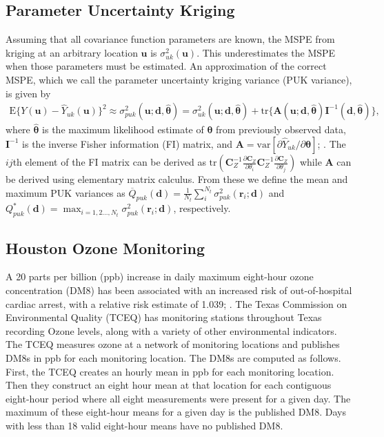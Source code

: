 \documentclass[cmbright]{staauth}
\newcommand{\var}{\mathrm{var}}
\newcommand{\E}{\mathrm{E}}
\newcommand{\tr}{\mathrm{tr}}
\begin{document}
\subsection{Parameter Uncertainty Kriging}
Assuming that all covariance function parameters are known, the MSPE from kriging at an arbitrary location $\bm{u}$ is $\sigma_{uk}^2(\bm{u})$. This underestimates the MSPE when those parameters must be estimated. An approximation of the correct MSPE, which we call the parameter uncertainty kriging variance (PUK variance), is given by
\begin{align*}
\E\{Y(\bm{u}) - \widehat{Y}_{uk}(\bm{u})\}^2 \approx \sigma^2_{puk}(\bm{u};\bm{d},\widehat{\bm{\theta}}) = \sigma^2_{uk}(\bm{u};\bm{d},\widehat{\bm{\theta}}) + \tr\{\bm{A}(\bm{u};\bm{d},\widehat{\bm{\theta}})\bm{I}^{-1}(\bm{d},\widehat{\bm{\theta}})\},
\end{align*}
where $\widehat{\bm{\theta}}$ is the maximum likelihood estimate of $\bm{\theta}$ from previously observed data, $\bm{I}^{-1}$ is the inverse Fisher information (FI) matrix, and $\bm{A} = \var[\partial \widehat{Y}_{uk} /\partial \bm{\theta}]$; \cite{zimmerman1992mean,abt1999estimating}. The $ij$th element of the FI matrix can be derived as $\tr\left(\bm{C}_Z^{-1}\frac{\partial\bm{C}_Z}{\partial\theta_i}\bm{C}_Z^{-1}\frac{\partial\bm{C}_Z}{\partial\theta_j}\right)$ while $\bm{A}$ can be derived using elementary matrix calculus. From these we define the mean and maximum  PUK variances as $\overline{Q}_{puk}(\bm{d}) = \frac{1}{N_t}\sum_{i}^{N_t}\sigma^2_{puk}(\bm{r}_i;\bm{d})$ and $Q_{puk}^*(\bm{d}) = \max_{i=1,2\dots,N_t}\sigma^2_{puk}(\bm{r}_i;\bm{d})$, respectively.

\subsection{Houston Ozone Monitoring}\label{sec:houston}
A 20 parts per billion (ppb) increase in daily maximum eight-hour ozone concentration (DM8) has been associated with an increased risk of out-of-hospital cardiac arrest, with a relative risk estimate of 1.039; \cite[95\% CI {[}1.005, 1.073{]},][]{ensor2013case}. The Texas Commission on Environmental Quality (TCEQ) has monitoring stations throughout Texas recording Ozone levels, along with a variety of other environmental indicators. The TCEQ measures ozone at a network of monitoring locations and publishes DM8s in ppb for each monitoring location. The DM8s are computed as follows. First, the TCEQ creates an hourly mean in ppb for each monitoring location. Then they construct an eight hour mean at that location for each contiguous eight-hour period where all eight measurements were present for a given day. The maximum of these eight-hour means for a given day is the published DM8. Days with less than 18 valid eight-hour means have no published DM8.
\end{document}
